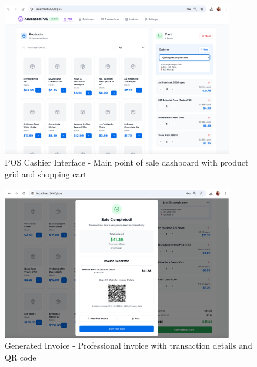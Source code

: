 \begin{figure}[H]
  \centering
  \includegraphics[width=0.9\textwidth]{working app screenshots/posinterface.png}
  \caption{POS Cashier Interface - Main point of sale dashboard with product grid and shopping cart}
  \label{fig:posinterface}
\end{figure}

\begin{figure}[H]
  \centering
  \includegraphics[width=0.9\textwidth]{working app screenshots/invoicegenerated.png}
  \caption{Generated Invoice - Professional invoice with transaction details and QR code}
  \label{fig:invoicegenerated}
\end{figure}

